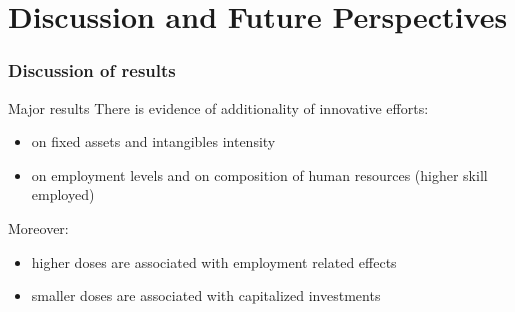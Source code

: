 \documentclass[10pt,handout,xcolor=pdftex,dvipsnames,table]{beamer}
\begin{document}
%
\section{Discussion and Future Perspectives}
\begin{frame}
\frametitle{Discussion of results}
\begin{block}{Major results} There is evidence of additionality of innovative efforts:
\begin{itemize}
\item on fixed assets and intangibles intensity
\item on employment levels and on composition of human resources (higher skill employed)
\end{itemize}

\end{block}
Moreover: 

\begin{block}{}
\begin{itemize}
\item higher doses are associated with employment related effects
\item smaller doses are associated with capitalized investments
\end{itemize}

\end{block}
\end{frame}
%
%
%
\end{document}
